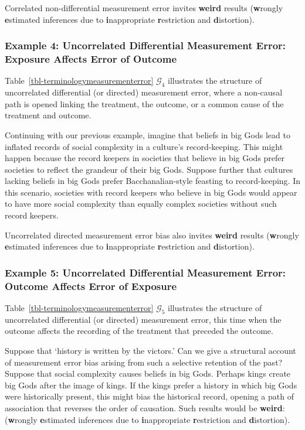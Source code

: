 \documentclass[
  single column]{article}
\begin{document}
Correlated non-differential measurement error invites \textbf{weird}
results (\textbf{w}rongly \textbf{e}stimated inferences due to
\textbf{i}nappropriate \textbf{r}estriction and \textbf{d}istortion).

\subsubsection{Example 4: Uncorrelated Differential Measurement Error:
Exposure Affects Error of
Outcome}\label{example-4-uncorrelated-differential-measurement-error-exposure-affects-error-of-outcome}

Table~\ref{tbl-terminologymeasurementerror} \(\mathcal{G}_4\)
illustrates the structure of uncorrelated differential (or directed)
measurement error, where a non-causal path is opened linking the
treatment, the outcome, or a common cause of the treatment and outcome.

Continuing with our previous example, imagine that beliefs in big Gods
lead to inflated records of social complexity in a culture's
record-keeping. This might happen because the record keepers in
societies that believe in big Gods prefer societies to reflect the
grandeur of their big Gods. Suppose further that cultures lacking
beliefs in big Gods prefer Bacchanalian-style feasting to
record-keeping. In this scenario, societies with record keepers who
believe in big Gods would appear to have more social complexity than
equally complex societies without such record keepers.

Uncorrelated directed measurement error bias also invites \textbf{weird}
results (\textbf{w}rongly \textbf{e}stimated inferences due to
\textbf{i}nappropriate \textbf{r}estriction and \textbf{d}istortion).

\subsubsection{Example 5: Uncorrelated Differential Measurement Error:
Outcome Affects Error of
Exposure}\label{example-5-uncorrelated-differential-measurement-error-outcome-affects-error-of-exposure}

Table~\ref{tbl-terminologymeasurementerror} \(\mathcal{G}_5\)
illustrates the structure of uncorrelated differential (or directed)
measurement error, this time when the outcome affects the recording of
the treatment that preceded the outcome.

Suppose that `history is written by the victors.' Can we give a
structural account of measurement error bias arising from such a
selective retention of the past? Suppose that social complexity causes
beliefs in big Gods. Perhaps kings create big Gods after the image of
kings. If the kings prefer a history in which big Gods were historically
present, this might bias the historical record, opening a path of
association that reverses the order of causation. Such results would be
\textbf{weird}: (\textbf{w}rongly \textbf{e}stimated inferences due to
\textbf{i}nappropriate \textbf{r}estriction and \textbf{d}istortion).
\end{document}
